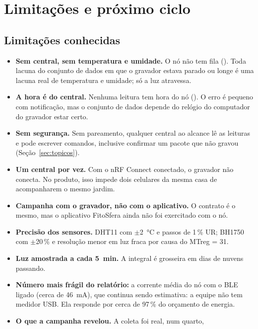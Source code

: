 \chapter{Limitações e próximo ciclo}
\label{cap:conclusao}
\rubricaComunicacao

\section{Limitações conhecidas}

\begin{itemize}
  \item \textbf{Sem central, sem temperatura e umidade.} O nó não tem fila
    (). Toda lacuna do conjunto de dados em que o gravador estava
    parado ou longe é uma lacuna real de temperatura e umidade; só a luz
    atravessa.
  \item \textbf{A hora é do central.} Nenhuma leitura tem hora do nó
    (). O erro é pequeno com notificação, mas o conjunto de dados
    depende do relógio do computador do gravador estar certo.
  \item \textbf{Sem segurança.} Sem pareamento, qualquer central ao alcance
    lê as leituras e pode escrever comandos, inclusive confirmar um pacote
    que não gravou (Seção~\ref{sec:topicos}).
  \item \textbf{Um central por vez.} Com o nRF Connect conectado, o gravador
    não conecta. No produto, isso impede dois celulares da mesma casa de
    acompanharem o mesmo jardim.
  \item \textbf{Campanha com o gravador, não com o aplicativo.} O contrato é
    o mesmo, mas o aplicativo FitoSfera ainda não foi exercitado com o nó.
  \item \textbf{Precisão dos sensores.} DHT11 com $\pm$\SI{2}{\celsius} e
    passos de 1\,\% UR; BH1750 com $\pm$20\,\% e resolução menor em luz
    fraca por causa do MTreg = 31.
  \item \textbf{Luz amostrada a cada \SI{5}{\minute}.} A integral é
    grosseira em dias de nuvens passando.
  \item \textbf{Número mais frágil do relatório:} a corrente média do nó
    com o BLE ligado (cerca de \SI{46}{\milli\ampere}), que continua sendo
    estimativa: a equipe não tem medidor USB. Ela responde por
    cerca de 97\,\% do orçamento de energia.
  \item \textbf{O que a campanha revelou.} A coleta foi real, num quarto,

\end{itemize}
